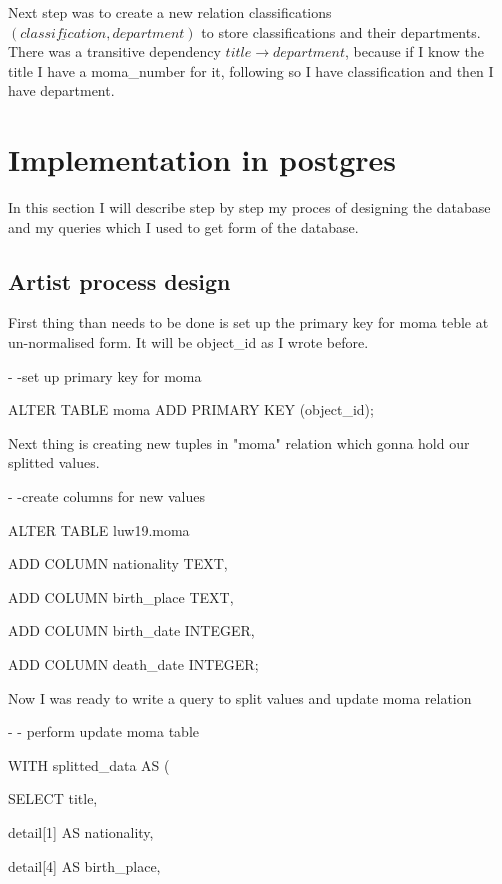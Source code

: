 \documentclass[journal,transmag]{IEEEtran}
\begin{document}
Next step was to create a new relation classifications $(\underline{classification},department)$ to store classifications and their departments. There was a transitive dependency $title \rightarrow  department$, because if I know the title I have a moma\_number for it, following so I have classification and then I have department.
\newpage

\section {Implementation in postgres}

In this section I will describe step by step my proces of designing the database and my queries which I used to get form of the database.

\subsection {Artist process design}

First thing than needs to be done is set up the primary key for moma teble at un-normalised form. It will be object\_id as I wrote before. 
\newline

- -set up primary key for moma

ALTER TABLE moma ADD PRIMARY KEY (object\_id);
\newline

Next thing is creating new tuples in "moma" relation which gonna hold our splitted values.
\newline

- -create columns for new values

ALTER TABLE luw19.moma

ADD COLUMN nationality TEXT,

ADD COLUMN birth\_place TEXT,

ADD COLUMN birth\_date INTEGER,

ADD COLUMN death\_date INTEGER;
\newline

Now I was ready to write a query to split values and update moma relation
\newline

- - perform update moma table

WITH splitted\_data AS (

SELECT title,

       detail[1] AS nationality,

       detail[4] AS birth\_place,
\end{document}
